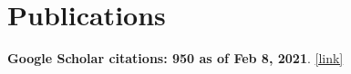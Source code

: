 \documentclass[11pt,a4paper,roman]{moderncv} %
\begin{document}
\section{Publications}
\vspace*{1mm}
{\color{color1} {\bfseries Google Scholar citations: 950 as of Feb 8, 2021}. \href{https://scholar.google.com/citations?user=Aqf-7Y0AAAAJ&hl=en}{[link]}}

\vspace*{3mm}
\end{document}
